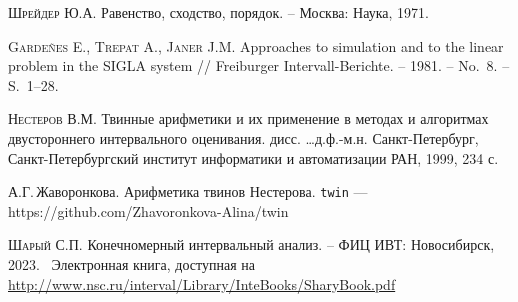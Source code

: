 \documentclass[a5paper,openany]{book}
\newcommand{\electronicbook}{}%
\newcommand{\doi}[1]{
	\ifdefined\electronicbook
	DOI:#1
	\fi}%
\begin{document}
\begin{thebibliography}{99}
		\textsc{Шрейдер Ю.А.} Равенство, сходство, порядок. -- Москва: Наука, 1971. 		
		
		
		\textsc{Garde\~{n}es E., Trepat A., Janer J.M.} Approaches to simulation and to the linear 
		problem in the SIGLA system // Freiburger Intervall-Berichte. -- 1981. -- No.~8. 
		-- S.~1--28. 
		
		\textsc{Нестеров В.М.} Твинные арифметики и их применение в методах и алгоритмах 
		двустороннего интервального оценивания. дисс. \ldots д.ф.-м.н. Санкт-Петербург, 
		Санкт-Петербургский институт информатики и автоматизации РАН, 1999, 234 с. 
		
			А.Г.\,Жаворонкова. Арифметика твинов Нестерова.
		{\tt twin} ---  https://github.com/Zhavoronkova-Alina/twin
		
		
		\textsc{Шарый С.П.} Конечномерный интервальный анализ. -- ФИЦ ИВТ: 
		Новосибирск, 2023. \     Электронная книга, доступная 
		на \url{http://www.nsc.ru/interval/Library/InteBooks/SharyBook.pdf} 
		
		
		
		
		
		

\end{thebibliography}
\end{document}
